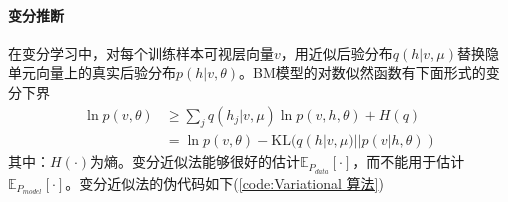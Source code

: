             \paragraph{变分推断}在变分学习中，对每个训练样本可视层向量$v$，用近似后验分布$q(h|v,\mu)$替换隐单元向量上的真实后验分布$p(h|v,\theta)$。BM模型的对数似然函数有下面形式的变分下界
            \begin{align*}
            \ln p(v,\theta) & \geqslant \sum_j q(h_j|v,\mu)\ln p(v,h,\theta) + H(q)\\
            & =\ln p(v,\theta) - \mathrm{KL}(q(h|v,\mu)||p(v|h,\theta))
            \end{align*}
            其中：$H(\cdot)$为熵。变分近似法能够很好的估计$\mathbb{E}_{P_{data}}[\cdot]$，而不能用于估计$\mathbb{E}_{P_{model}}[\cdot]$。变分近似法的伪代码如下(\ref{code:Variational 算法})
